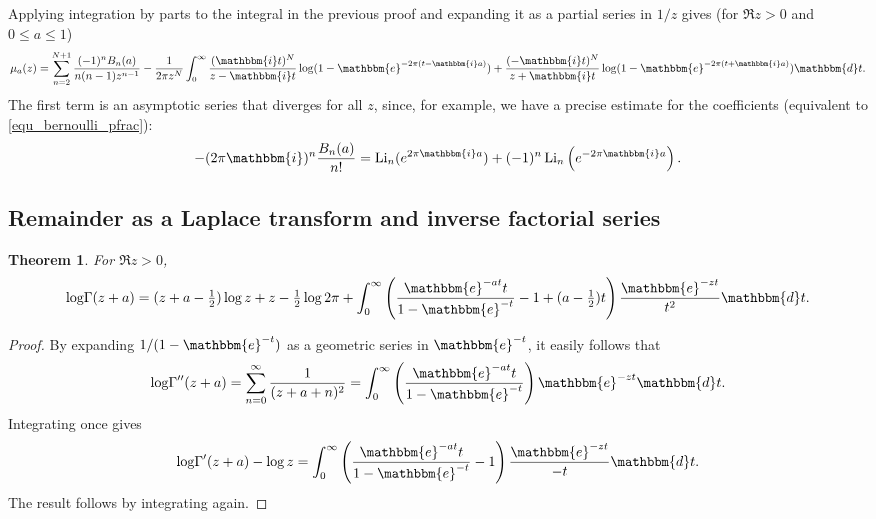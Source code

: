 \documentclass[12pt]{article}
\newcommand{\op}[1]  { \operatorname{ #1 }}
\newcommand{\logG} {\operatorname {log \Gamma}}
\newcommand{\ee}[0] {\mathbbm{e}}
\newcommand{\ii}[0] {\mathbbm{i}}
\newcommand{\dd}[0] {\mathbbm{d}}
\numberwithin{equation}{section}
\newtheorem{theorem}{Theorem}[section]
\begin{document}
Applying integration by parts to the integral in the previous proof and expanding it as a partial series in $1/z$ gives (for $\Re z > 0$ and $0 \le a \le 1$)
\begin{equation*}
\mu_a(z) = \sum_{n=2}^{N+1} \frac{(-1)^n B_n(a)}{n(n-1) z^{n-1}} - \frac{1}{2\pi z^N} \int_{0}^{\infty} \frac{(\ii t)^N}{z - \ii t} \log(1-\ee^{-2\pi(t-\ii a)}) + \frac{(-\ii t)^N}{z + \ii t} \log(1-\ee^{-2\pi(t+\ii a)}) \dd t\text{.}
\end{equation*}
The first term is an asymptotic series that diverges for all $z$, since, for example, we have a precise estimate for the coefficients (equivalent to \eqref{equ_bernoulli_pfrac}):
\begin{equation*}
- (2 \pi \ii)^{n} \frac{B_n(a)}{n!}= \op{Li}_n (e^{2 \pi \ii a}) + (-1)^n \op{Li}_n\left(e^{-2 \pi \ii a}\right)\text{.}
\end{equation*}


\subsection{Remainder as a Laplace transform and inverse factorial series}
\begin{theorem}
For $\Re z > 0$,
\begin{align*}
\logG (z+a) = (z+a-\tfrac{1}{2}) \log z + z - \tfrac{1}{2} \log 2\pi + \int_0^{\infty} \left( \frac{ \ee^{-at}t}{1-\ee^{-t}}-1+(a-\tfrac{1}{2})t \right) \frac{\ee^{-z t}}{t^2} \dd t \text{.}
\end{align*}
\end{theorem}
\begin{proof}
By expanding $1/(1-\ee^{-t})$ as a geometric series in $\ee^{-t}$, it easily follows that
\begin{equation*}
\logG''(z+a) = \sum_{n=0}^{\infty}\frac{1}{(z+a+n)^2} = \int_0^{\infty} \left( \frac{ \ee^{-at}t}{1-\ee^{-t}}\right) \ee^{-z t} \dd t\text{.}
\end{equation*}
Integrating once gives
\begin{equation}
\label{equ_loggamma_laplace}
\logG'(z+a) - \log z = \int_0^{\infty} \left( \frac{ \ee^{-at}t}{1-\ee^{-t}}-1\right) \frac{\ee^{-z t}}{-t} \dd t\text{.}
\end{equation}
The result follows by integrating again.
\end{proof}
\end{document}
